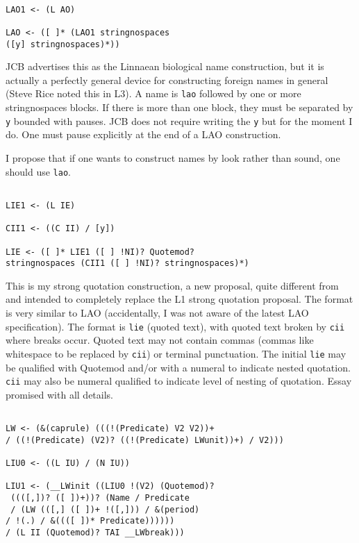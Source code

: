 \documentclass[12pt]{article}
\begin{document}
\begin{verbatim}

LAO1 <- (L AO)

LAO <- ([ ]* (LAO1 stringnospaces 
([y] stringnospaces)*))

\end{verbatim}

JCB advertises this as the Linnaean biological name construction, but it is actually a perfectly general device for constructing foreign names in general (Steve Rice noted this in L3).  A name is {\tt lao} followed by one or more stringnospaces blocks.  If there is more than one block, they
must be separated by {\tt y} bounded with pauses.  JCB does not require writing the {\tt y} but for the moment I do.  One
must pause explicitly at the end of a LAO construction.

I propose that if one wants to construct names by look rather than sound, one should use {\tt lao}.

\begin{verbatim}

LIE1 <- (L IE)

CII1 <- ((C II) / [y])

LIE <- ([ ]* LIE1 ([ ] !NI)? Quotemod? 
stringnospaces (CII1 ([ ] !NI)? stringnospaces)*)

\end{verbatim}

This is my strong quotation construction, a new proposal, quite different from and intended to completely replace the L1 strong quotation proposal.  The format is very similar to LAO (accidentally, I was not aware of the latest
LAO specification).  The format is {\tt lie} (quoted text), with quoted text broken by {\tt cii} where breaks occur.
Quoted text may not contain commas (commas like whitespace to be replaced by {\tt cii})  or terminal punctuation.  The initial {\tt lie} may be qualified with Quotemod
and/or with a numeral to indicate nested quotation.  {\tt cii} may also be numeral qualified to indicate level of nesting
of quotation.  Essay promised with all details.

\begin{verbatim}

LW <- (&(caprule) (((!(Predicate) V2 V2))+ 
/ ((!(Predicate) (V2)? ((!(Predicate) LWunit))+) / V2)))

LIU0 <- ((L IU) / (N IU))

LIU1 <- (__LWinit ((LIU0 !(V2) (Quotemod)?
 ((([,])? ([ ])+))? (Name / Predicate
 / (LW (([,] ([ ])+ !([,])) / &(period) 
/ !(.) / &((([ ])* Predicate)))))) 
/ (L II (Quotemod)? TAI __LWbreak)))

\end{verbatim}
\end{document}
